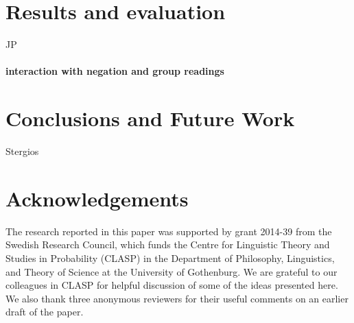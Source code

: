\documentclass[a4paper,11pt]{article}
\begin{document}
\section{Results and evaluation}
JP
\paragraph{interaction with negation and group readings}

\section{Conclusions and Future Work}
Stergios
\section*{Acknowledgements}

The research reported in this paper was supported by grant 2014-39 from the
Swedish Research Council, which funds the Centre for Linguistic Theory and
Studies in Probability (CLASP) in the Department of Philosophy, Linguistics,
and Theory of Science at the University of Gothenburg. We are grateful to
our colleagues in CLASP for helpful discussion of some of the ideas presented
here. We also thank three anonymous reviewers for their useful comments on an
earlier draft of the paper.


\end{document}
